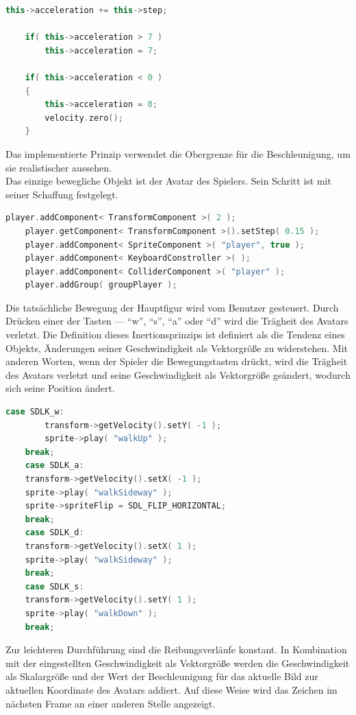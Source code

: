 \documentclass[
  10pt,
  a4paper,
  oneside,
  headers,
  headinclude,
  footinclude,
  BCOR5mm,
]{article}
\begin{document}
\begin{lstlisting}[language=C++]
    this->acceleration += this->step;

    if( this->acceleration > 7 )
        this->acceleration = 7;

    if( this->acceleration < 0 )
    {
        this->acceleration = 0;
        velocity.zero();
    }
\end{lstlisting}

Das implementierte Prinzip verwendet die Obergrenze für die Beschleunigung, um
sie realistischer aussehen. \\
Das einzige bewegliche Objekt ist der Avatar des Spielers. Sein Schritt ist mit
seiner Schaffung festgelegt.

\begin{lstlisting}[language=C++]
    player.addComponent< TransformComponent >( 2 );
    player.getComponent< TransformComponent >().setStep( 0.15 );
    player.addComponent< SpriteComponent >( "player", true );
    player.addComponent< KeyboardConstroller >( );
    player.addComponent< ColliderComponent >( "player" );
    player.addGroup( groupPlayer );
\end{lstlisting}

Die tatsächliche Bewegung der Hauptfigur wird vom Benutzer gesteuert. Durch
Drücken einer der Tasten --- ``w'', ``s'', ``a'' oder ``d'' wird die Trägheit des
Avatars verletzt. Die Definition dieses Inertionsprinzips ist definiert als die
Tendenz eines Objekts, Änderungen seiner Geschwindigkeit als Vektorgröße zu
widerstehen. Mit anderen Worten, wenn der Spieler die Bewegungstasten drückt,
wird die Trägheit des Avatars verletzt und seine Geschwindigkeit als Vektorgröße
geändert, wodurch sich seine Position ändert. \\

\begin{lstlisting}[language=C++]
    case SDLK_w:
        transform->getVelocity().setY( -1 );
        sprite->play( "walkUp" );
	break;
    case SDLK_a:
	transform->getVelocity().setX( -1 );
	sprite->play( "walkSideway" );
	sprite->spriteFlip = SDL_FLIP_HORIZONTAL;
	break;
    case SDLK_d:
	transform->getVelocity().setX( 1 );
	sprite->play( "walkSideway" );
	break;
    case SDLK_s:
	transform->getVelocity().setY( 1 );
	sprite->play( "walkDown" );
	break;
\end{lstlisting}

Zur leichteren Durchführung sind die Reibungsverläufe konstant. In Kombination
mit der eingestellten Geschwindigkeit als Vektorgröße werden die Geschwindigkeit
als Skalargröße und der Wert der Beschleunigung für das aktuelle Bild zur
aktuellen Koordinate des Avatars addiert. Auf diese Weise wird das Zeichen im
nächsten Frame an einer anderen Stelle angezeigt.
\end{document}
